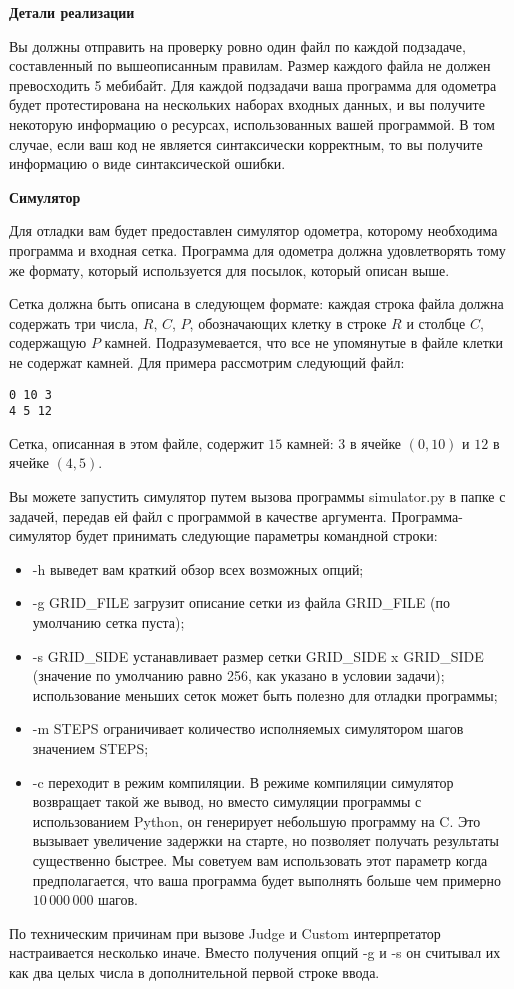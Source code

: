 \textbf{Детали реализации}

Вы должны отправить на проверку ровно один файл по каждой подзадаче, составленный
по вышеописанным правилам. Размер каждого файла не должен превосходить 5 мебибайт.
Для каждой подзадачи ваша программа для одометра будет протестирована на нескольких
наборах входных данных, и вы получите некоторую информацию о ресурсах,
использованных вашей программой. В том случае, если ваш код не является
синтаксически корректным, то вы получите информацию о виде синтаксической ошибки.

\textbf{Симулятор}

Для отладки вам будет предоставлен симулятор одометра, которому необходима
программа и входная сетка. Программа для одометра должна удовлетворять тому же
формату, который используется для посылок, который описан выше.

Сетка должна быть описана в следующем формате: каждая строка файла должна содержать
три числа, $R$, $C$, $P$, обозначающих клетку в строке $R$ и столбце $C$, содержащую $P$ камней.
Подразумевается, что все не упомянутые в файле клетки не содержат камней. Для примера
рассмотрим следующий файл:

\begin{lstlisting}
0 10 3
4 5 12
\end{lstlisting}

Сетка, описанная в этом файле, содержит $15$ камней: $3$ в ячейке $(0, 10)$ и $12$ в ячейке $(4, 5)$.

Вы можете запустить симулятор путем вызова программы simulator.py в папке с
задачей, передав ей файл с программой в качестве аргумента. Программа-симулятор будет
принимать следующие параметры командной строки:
\begin{itemize}
\item -h выведет вам краткий обзор всех возможных опций;
\item -g GRID_FILE загрузит описание сетки из файла GRID_FILE (по умолчанию
сетка пуста);
\item -s GRID_SIDE устанавливает размер сетки GRID_SIDE x GRID_SIDE
(значение по умолчанию равно 256, как указано в условии задачи); использование
меньших сеток может быть полезно для отладки программы;
\item -m STEPS ограничивает количество исполняемых симулятором шагов значением
STEPS;
\item -c переходит в режим компиляции. В режиме компиляции симулятор возвращает
такой же вывод, но вместо симуляции программы с использованием Python, он
генерирует небольшую программу на C. Это вызывает увеличение задержки на
старте, но позволяет получать результаты существенно быстрее. Мы советуем вам
использовать этот параметр когда предполагается, что ваша программа будет
выполнять больше чем примерно $10\,000\,000$ шагов.

\end{itemize}

По техническим причинам при вызове Judge и Custom интерпретатор настраивается несколько иначе. Вместо получения опций -g и -s он считывал их как два целых числа в дополнительной первой строке ввода.